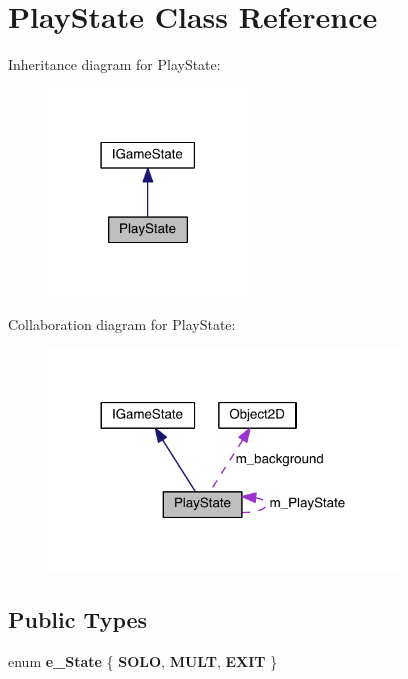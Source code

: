 \hypertarget{class_play_state}{}\section{Play\+State Class Reference}
\label{class_play_state}


Inheritance diagram for Play\+State\+:\nopagebreak
\begin{figure}[H]
\begin{center}
\leavevmode
\includegraphics[width=150pt]{class_play_state__inherit__graph}
\end{center}
\end{figure}


Collaboration diagram for Play\+State\+:\nopagebreak
\begin{figure}[H]
\begin{center}
\leavevmode
\includegraphics[width=264pt]{class_play_state__coll__graph}
\end{center}
\end{figure}
\subsection*{Public Types}
\begin{DoxyCompactItemize}
\item 
\hypertarget{class_play_state_a8e1bb5cc77d10364f4da6a85d277b70f}{}enum {\bfseries e\+\_\+\+State} \{ {\bfseries S\+O\+L\+O}, 
{\bfseries M\+U\+L\+T}, 
{\bfseries E\+X\+I\+T}
 \}\label{class_play_state_a8e1bb5cc77d10364f4da6a85d277b70f}

\end{DoxyCompactItemize}
